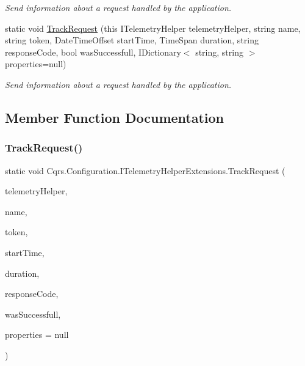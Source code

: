 \begin{DoxyCompactItemize}
\begin{DoxyCompactList}\small\item\em Send information about a request handled by the application. \end{DoxyCompactList}\item 
static void \hyperlink{classCqrs_1_1Configuration_1_1ITelemetryHelperExtensions_aba815675738eed8509d2ad4d327b591d_aba815675738eed8509d2ad4d327b591d}{Track\+Request} (this I\+Telemetry\+Helper telemetry\+Helper, string name, string token, Date\+Time\+Offset start\+Time, Time\+Span duration, string response\+Code, bool was\+Successfull, I\+Dictionary$<$ string, string $>$ properties=null)
\begin{DoxyCompactList}\small\item\em Send information about a request handled by the application. \end{DoxyCompactList}\end{DoxyCompactItemize}


\subsection{Member Function Documentation}
\mbox{\label{classCqrs_1_1Configuration_1_1ITelemetryHelperExtensions_a8e248c0990f9abd8f9d7f06a6e82c1d6_a8e248c0990f9abd8f9d7f06a6e82c1d6}} 
\subsubsection{\texorpdfstring{Track\+Request()}{TrackRequest()}\hspace{0.1cm}{\footnotesize\ttfamily [1/3]}}
{\footnotesize\ttfamily static void Cqrs.\+Configuration.\+I\+Telemetry\+Helper\+Extensions.\+Track\+Request (\begin{DoxyParamCaption}\item[{this I\+Telemetry\+Helper}]{telemetry\+Helper,  }\item[{string}]{name,  }\item[{Guid?}]{token,  }\item[{Date\+Time\+Offset}]{start\+Time,  }\item[{Time\+Span}]{duration,  }\item[{string}]{response\+Code,  }\item[{bool}]{was\+Successfull,  }\item[{I\+Dictionary$<$ string, string $>$}]{properties = {\ttfamily null} }\end{DoxyParamCaption})\hspace{0.3cm}{\ttfamily [static]}}



